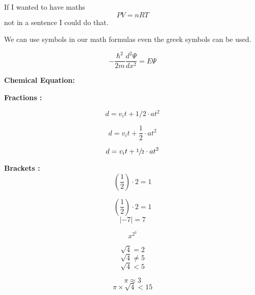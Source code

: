\documentclass{article}
\begin{document}
If I wanted to have maths $$PV = nRT$$ not in a sentence I could do that.

We can use symbols in our math formulas even the greek symbols can be used.

$$-\frac{\hbar^2}{2m}\frac{d^2\Psi}{dx^2} = E\Psi$$  %

\bfseries {Chemical Equation}: 



\bfseries{Fractions} :

$$d = v_it + 1/2 \cdot at^2$$ %


$$d = v_it + \frac{1}{2} \cdot at^2$$ 

$$d = v_it + \sfrac{1}{2} \cdot at^2$$ 

\bfseries Brackets :
$$(\frac{1}{2}) \cdot 2 = 1$$ %

$$\left(   \frac{1}{2}   \right) \cdot 2 = 1$$
$$\left| -7 \right| = 7$$

$$x^{2^3}$$

$$\sqrt{4} = 2$$
$$\sqrt{4} \neq 5 $$ %
$$\sqrt{4} < 5$$

$$\pi \approx 3 $$
$$\pi \times \sqrt{4} < 15 $$
\end{document}

